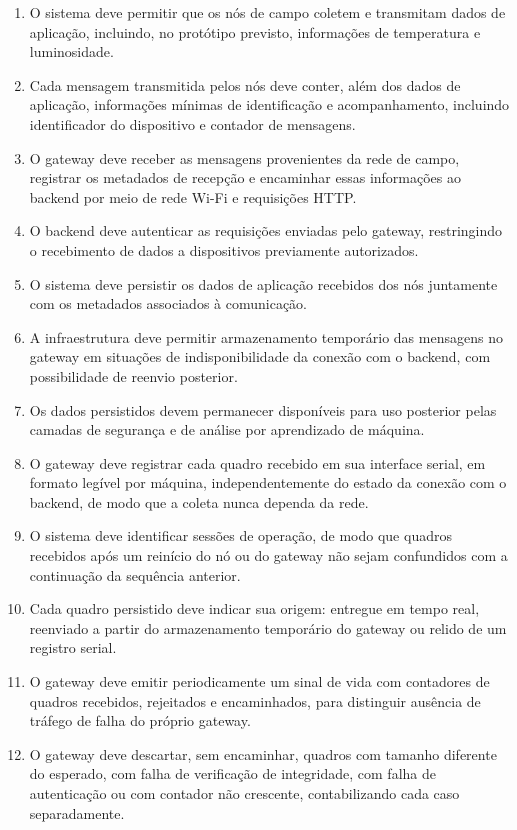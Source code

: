 \begin{enumerate}
    \item[RF1.] O sistema deve permitir que os nós de campo coletem e transmitam dados de aplicação, incluindo, no protótipo previsto, informações de temperatura e luminosidade.

    \item[RF2.] Cada mensagem transmitida pelos nós deve conter, além dos dados de aplicação, informações mínimas de identificação e acompanhamento, incluindo identificador do dispositivo e contador de mensagens.

    \item[RF3.] O gateway deve receber as mensagens provenientes da rede de campo, registrar os metadados de recepção e encaminhar essas informações ao backend por meio de rede Wi-Fi e requisições HTTP.

    \item[RF4.] O backend deve autenticar as requisições enviadas pelo gateway, restringindo o recebimento de dados a dispositivos previamente autorizados.

    \item[RF5.] O sistema deve persistir os dados de aplicação recebidos dos nós juntamente com os metadados associados à comunicação.

    \item[RF6.] A infraestrutura deve permitir armazenamento temporário das mensagens no gateway em situações de indisponibilidade da conexão com o backend, com possibilidade de reenvio posterior.

    \item[RF7.] Os dados persistidos devem permanecer disponíveis para uso posterior pelas camadas de segurança e de análise por aprendizado de máquina.

    \item[RF8.] O gateway deve registrar cada quadro recebido em sua interface serial, em formato legível por máquina, independentemente do estado da conexão com o backend, de modo que a coleta nunca dependa da rede.

    \item[RF9.] O sistema deve identificar sessões de operação, de modo que quadros recebidos após um reinício do nó ou do gateway não sejam confundidos com a continuação da sequência anterior.

    \item[RF10.] Cada quadro persistido deve indicar sua origem: entregue em tempo real, reenviado a partir do armazenamento temporário do gateway ou relido de um registro serial.

    \item[RF11.] O gateway deve emitir periodicamente um sinal de vida com contadores de quadros recebidos, rejeitados e encaminhados, para distinguir ausência de tráfego de falha do próprio gateway.

    \item[RF12.] O gateway deve descartar, sem encaminhar, quadros com tamanho diferente do esperado, com falha de verificação de integridade, com falha de autenticação ou com contador não crescente, contabilizando cada caso separadamente.

\end{enumerate}


